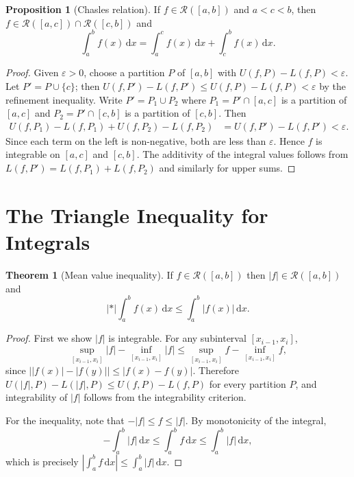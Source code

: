 \documentclass[12pt,a4paper]{book}
\theoremstyle{definition}
\newtheorem{theorem}{Theorem}[chapter]
\newtheorem{proposition}{Proposition}[chapter]
\newcommand{\eps}{\varepsilon}
\newcommand{\abs}[1]{\left\lvert #1 \right\rvert}
\newcommand{\dd}{\,\mathrm{d}}
\begin{document}
\begin{proposition}[Chasles relation]\label{prop:chasles}
  If $f\in\mathcal{R}([a,b])$ and $a<c<b$, then
  $f\in\mathcal{R}([a,c])\cap\mathcal{R}([c,b])$ and
  \[
    \int_a^b f(x)\dd x = \int_a^c f(x)\dd x + \int_c^b f(x)\dd x.
  \]
\end{proposition}

\begin{proof}
  Given $\eps>0$, choose a partition $P$ of $[a,b]$ with
  $U(f,P)-L(f,P)<\eps$.  Let $P'=P\cup\{c\}$; then
  $U(f,P')-L(f,P')\le U(f,P)-L(f,P)<\eps$ by the refinement inequality.
  Write $P'=P_1\cup P_2$ where $P_1=P'\cap[a,c]$ is a partition of
  $[a,c]$ and $P_2=P'\cap[c,b]$ is a partition of $[c,b]$.  Then
  \begin{align*}
    U(f,P_1)-L(f,P_1) + U(f,P_2)-L(f,P_2)
    &= U(f,P')-L(f,P') < \eps.
  \end{align*}
  Since each term on the left is non-negative, both are less than $\eps$.
  Hence $f$ is integrable on $[a,c]$ and $[c,b]$.  The additivity of the
  integral values follows from $L(f,P')=L(f,P_1)+L(f,P_2)$ and similarly
  for upper sums.
\end{proof}


\section{The Triangle Inequality for Integrals}\label{sec:int-triangle}

\begin{theorem}[Mean value inequality]\label{thm:mean-value-ineq}
  If $f\in\mathcal{R}([a,b])$ then $\abs{f}\in\mathcal{R}([a,b])$ and
  \[
    \abs*{\int_a^b f(x)\dd x} \le \int_a^b \abs{f(x)}\dd x.
  \]
\end{theorem}

\begin{proof}
  First we show $\abs{f}$ is integrable.  For any subinterval
  $[x_{i-1},x_i]$,
  \[
    \sup_{[x_{i-1},x_i]}\abs{f} - \inf_{[x_{i-1},x_i]}\abs{f}
    \le \sup_{[x_{i-1},x_i]} f - \inf_{[x_{i-1},x_i]} f,
  \]
  since $\bigl|\abs{f(x)}-\abs{f(y)}\bigr|\le\abs{f(x)-f(y)}$.
  Therefore $U(\abs{f},P)-L(\abs{f},P)\le U(f,P)-L(f,P)$ for every
  partition $P$, and integrability of $\abs{f}$ follows from the
  integrability criterion.

  For the inequality, note that $-\abs{f}\le f\le\abs{f}$.  By
  monotonicity of the integral,
  \[
    -\int_a^b\abs{f}\dd x \le \int_a^b f\dd x \le \int_a^b\abs{f}\dd x,
  \]
  which is precisely $\abs{\int_a^b f\dd x}\le\int_a^b\abs{f}\dd x$.
\end{proof}
\end{document}
